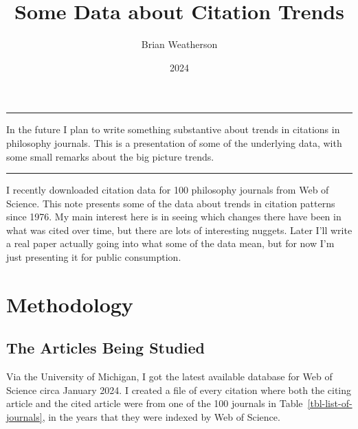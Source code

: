 \documentclass[
  10pt,
  letterpaper,
  DIV=11,
  numbers=noendperiod,
  twoside]{scrartcl}
\title{Some Data about Citation Trends}
\author{Brian Weatherson}
\date{2024}
\renewenvironment{abstract}
 {\vspace{-1.25cm}
 \quotation\small\noindent\rule{\linewidth}{.5pt}\par\smallskip
 \noindent }
 {\par\noindent\rule{\linewidth}{.5pt}\endquotation}
\begin{document}
\maketitle
\begin{abstract}
In the future I plan to write something substantive about trends in
citations in philosophy journals. This is a presentation of some of the
underlying data, with some small remarks about the big picture trends.
\end{abstract}

I recently downloaded citation data for 100 philosophy journals from Web
of Science. This note presents some of the data about trends in citation
patterns since 1976. My main interest here is in seeing which changes
there have been in what was cited over time, but there are lots of
interesting nuggets. Later I'll write a real paper actually going into
what some of the data mean, but for now I'm just presenting it for
public consumption.

\section{Methodology}\label{methodology}

\subsection{The Articles Being
Studied}\label{the-articles-being-studied}

Via the University of Michigan, I got the latest available database for
Web of Science circa January 2024. I created a file of every citation
where both the citing article and the cited article were from one of the
100 journals in Table~\ref{tbl-list-of-journals}, in the years that they
were indexed by Web of Science.
\end{document}
